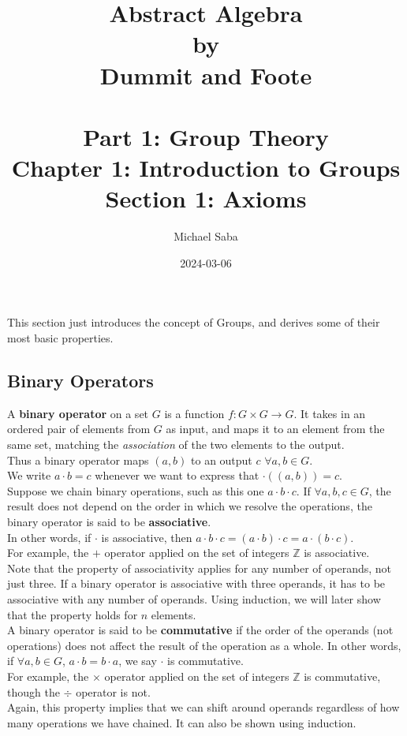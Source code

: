 \documentclass[12pt]{article}
\title{%
    \Huge Abstract Algebra \\
    \large by \\
    \Large Dummit and Foote \\~\\
    \huge Part 1: Group Theory \\
    \LARGE Chapter 1: Introduction to Groups \\
    \Large Section 1: Axioms
}
\date{2024-03-06}
\author{Michael Saba}
\newcommand{\Z}{\mathbb{Z}}
\begin{document}
    \maketitle
    \newpage

    This section just introduces the concept of Groups,
    and derives some of their most basic properties. \\

    \subsection*{Binary Operators}
    
    A \textbf{binary operator} on a set $G$ is a function
    $f: G \times G \rightarrow G$.
    It takes in an ordered pair of elements from $G$ as input,
    and maps it to an element from the same set,
    matching the \textit{association} of the two elements to the output. \\
    Thus a binary operator maps $(a, b)$
    to an output $c$ $\forall a, b \in G$. \\
    We write $a \cdot b = c$ whenever we want to express that 
    $\cdot((a, b)) = c$. \\

    Suppose we chain binary operations,
    such as this one $a \cdot b \cdot c$.
    If $\forall a, b, c \in G$,
    the result does not depend on the order
    in which we resolve the operations,
    the binary operator is said to be \textbf{associative}. \\
    In other words, if $\cdot$ is associative,
    then
    $a \cdot b \cdot c = (a \cdot b) \cdot c = a \cdot (b \cdot c)$. \\
    For example,
    the $+$ operator applied on the set of integers $\Z$
    is associative. \\
    Note that the property of associativity
    applies for any number of operands,
    not just three.
    If a binary operator is associative with three operands,
    it has to be associative with any number of operands.
    Using induction,
    we will later show that the property holds for $n$ elements. \\

    A binary operator is said to be \textbf{commutative}
    if the order of the operands (not operations) does not affect
    the result of the operation as a whole.
    In other words, if $\forall a, b \in G$,
    $a \cdot b = b \cdot a$,
    we say $\cdot$ is commutative. \\
    For example,
    the $\times$ operator applied on the set of integers $\Z$
    is commutative,
    though the $\div$ operator is not. \\
    Again, this property implies that we can shift around operands
    regardless of how many operations we have chained.
    It can also be shown using induction. \\
\end{document}
